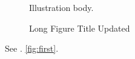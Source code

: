 \begin{figure}
\caption[Short Figure Updated]{Long Figure Title Updated}\label{fig:first}
Illustration body.
\end{figure}
See . \autoref{fig:first}.
